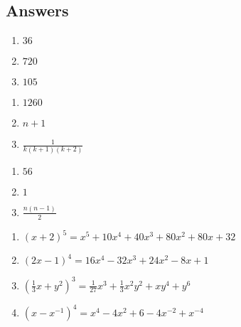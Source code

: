 \documentclass{ximera}
\begin{document}
\newpage

\subsection{Answers}



\begin{multicols}{3}
\begin{enumerate}

\item  $36$

\item  $720$

\item  $105$

\setcounter{HW}{\value{enumi}}
\end{enumerate}
\end{multicols}

\begin{multicols}{3}
\begin{enumerate}
\setcounter{enumi}{\value{HW}}

\item  $1260$

\item  $n+1$

\item  $\frac{1}{k(k+1)(k+2)}$

\setcounter{HW}{\value{enumi}}
\end{enumerate}
\end{multicols}

\begin{multicols}{3}
\begin{enumerate}
\setcounter{enumi}{\value{HW}}

\item  $56$

\item  $1$

\item  $\frac{n(n-1)}{2}$

\setcounter{HW}{\value{enumi}}
\end{enumerate}
\end{multicols}


\begin{enumerate}
\setcounter{enumi}{\value{HW}}

\item  $(x+2)^5 = x^5+10x^4+40x^3+80x^2+80x+32$

\item  $(2x-1)^4 = 16x^4-32x^3+24x^2-8x+1$

\item  $\left(\frac{1}{3} x +  y^2\right)^3 = \frac{1}{27} x^3+\frac{1}{3}x^2y^2+xy^4+y^6$

\item  $\left(x - x^{-1} \right)^{4} = x^4-4x^2+6-4x^{-2}+x^{-4}$

\setcounter{HW}{\value{enumi}}
\end{enumerate}
\end{document}
